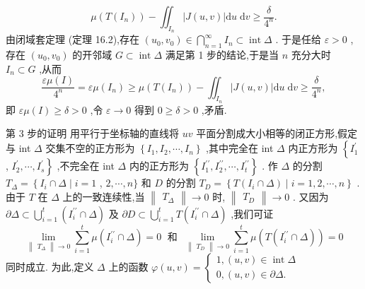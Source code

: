 \[
\mu \left( {T\left( {I}_{n}\right) }\right)  - {\iint }_{{I}_{n}}\left| {J\left( {u,v}\right) }\right| \mathrm{d}u\mathrm{\;d}v \geq  \frac{\delta }{{4}^{n}}.
\]
由闭域套定理 (定理 16.2),存在 \(\left( {{u}_{0},{v}_{0}}\right)  \in  \mathop{\bigcap }\limits_{{n = 1}}^{\infty }{I}_{n} \subset  \operatorname{int}\Delta\) . 于是任给 \(\varepsilon  > 0\) ,存在 \(\left( {{u}_{0},{v}_{0}}\right)\) 的开邻域 \(G \subset  \operatorname{int}\Delta\) 满足第 1 步的结论,于是当 \(n\) 充分大时 \({I}_{n} \subset  G\) ,从而
\[
\frac{{\varepsilon \mu }\left( I\right) }{{4}^{n}} = {\varepsilon \mu }\left( {I}_{n}\right)  \geq  \mu \left( {T\left( {I}_{n}\right) }\right)  - {\iint }_{{I}_{n}}\left| {J\left( {u,v}\right) }\right| \mathrm{d}u\mathrm{\;d}v \geq  \frac{\delta }{{4}^{n}},
\]
即 \({\varepsilon \mu }\left( I\right)  \geq  \delta  > 0\) ,令 \(\varepsilon  \rightarrow  0\) 得到 \(0 \geq  \delta  > 0\) ,矛盾.

第 3 步的证明 用平行于坐标轴的直线将 \({uv}\) 平面分割成大小相等的闭正方形,假定与 int \(\Delta\) 交集不空的正方形为 \(\left\{  {{I}_{1},{I}_{2},\cdots ,{I}_{n}}\right\}\) ,其中完全在 int \(\Delta\) 内正方形为 \(\left\{  {I}_{1}^{\prime }\right.\) , \(\left. {{I}_{2}^{\prime },\cdots ,{I}_{s}^{\prime }}\right\}\) ,不完全在 int \(\Delta\) 内的正方形为 \(\left\{  {{I}_{1}^{\prime \prime },{I}_{2}^{\prime \prime },\cdots ,{I}_{t}^{\prime \prime }}\right\}\) . 作 \(\Delta\) 的分割 \({T}_{\Delta } = \left\{  {{I}_{i} \cap  \Delta  \mid  i = 1}\right.\) , \(2,\cdots ,n\}\) 和 \(D\) 的分割 \({T}_{D} = \left\{  {T\left( {{I}_{i} \cap  \Delta }\right)  \mid  i = 1,2,\cdots ,n}\right\}\) . 由于 \(T\) 在 \(\Delta\) 上的一致连续性,当 \(\begin{Vmatrix}{T}_{\Delta }\end{Vmatrix} \rightarrow  0\) 时, \(\begin{Vmatrix}{T}_{D}\end{Vmatrix} \rightarrow  0\) . 又因为 \(\partial \Delta  \subset  \mathop{\bigcup }\limits_{{i = 1}}^{t}\left( {{I}_{i}^{\prime \prime } \cap  \Delta }\right)\) 及 \(\partial D \subset  \mathop{\bigcup }\limits_{{i = 1}}^{t}T\left( {{I}_{i}^{\prime \prime } \cap  \Delta }\right)\) ,我们可证
\[
\mathop{\lim }\limits_{{\begin{Vmatrix}{T}_{\Delta }\end{Vmatrix} \rightarrow  0}}\mathop{\sum }\limits_{{i = 1}}^{t}\mu \left( {{I}_{i}^{\prime \prime } \cap  \Delta }\right)  = 0\;\text{ 和 }\;\mathop{\lim }\limits_{{\begin{Vmatrix}{T}_{D}\end{Vmatrix} \rightarrow  0}}\mathop{\sum }\limits_{{i = 1}}^{t}\mu \left( {T\left( {{I}_{i}^{\prime \prime } \cap  \Delta }\right) }\right)  = 0
\]
同时成立. 为此,定义 \(\Delta\) 上的函数 \(\varphi \left( {u,v}\right)  = \left\{  \begin{array}{l} 1,\left( {u,v}\right)  \in  \operatorname{int}\Delta \\  0,\left( {u,v}\right)  \in  \partial \Delta . \end{array}\right.\)

